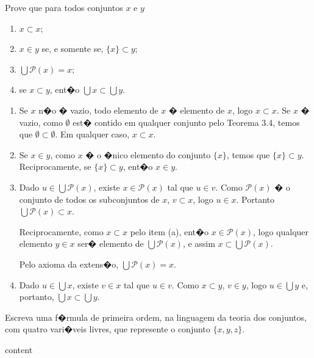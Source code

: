 \begin{exercicio}
	Prove que para todos conjuntos $x$ e $y$
	\begin{enumerate}[label=(\alph{*})]
		\item $x\subset x$;
		\item $x\in y$ se, e somente se, $\{x\}\subset y$;
		\item $\bigcup\mathcal{P}(x)=x$;
		\item se $x\subset y$, ent�o $\bigcup x\subset \bigcup y$.
	\end{enumerate}
\end{exercicio}
\begin{solucao}
	\begin{enumerate}[label=(\alph{*})]
		\item Se $x$ n�o � vazio, todo elemento de $x$ � elemento de $x$, logo $x\subset x$. Se $x$ � vazio, como $\emptyset$ est� contido em qualquer conjunto pelo Teorema 3.4, temos que $\emptyset\subset \emptyset$. Em qualquer caso, $x\subset x$.
		\item Se $x\in y$, como $x$ � o �nico elemento do conjunto $\{x\}$, temos que $\{x\}\subset y$. Reciprocamente, se $\{x\}\subset y$, ent�o $x\in y$.
		\item Dado $u\in\bigcup\mathcal{P}(x)$, existe $x\in\mathcal{P}(x)$ tal que $u\in v$. Como $\mathcal{P}(x)$ � o conjunto de todos os subconjuntos de $x$, $v\subset x$, logo $u\in x$. Portanto $\bigcup\mathcal{P}(x)\subset x$.
		
		Reciprocamente, como $x\subset x$ pelo item (a), ent�o $x\in\mathcal{P}(x)$, logo qualquer elemento $y\in x$ ser� elemento de $\bigcup\mathcal{P}(x)$, e assim $x\subset \bigcup\mathcal{P}(x)$.
		
		Pelo axioma da extens�o, $\bigcup\mathcal{P}(x)=x$.
		\item Dado $u\in\bigcup x$, existe $v\in x$ tal que $u\in v$. Como $x\subset y$, $v\in y$, logo $u\in\bigcup y$ e, portanto, $\bigcup x\subset\bigcup y$.
	\end{enumerate}
\end{solucao}

\begin{exercicio}
	Escreva uma f�rmula de primeira ordem, na linguagem da teoria dos conjuntos, com quatro vari�veis livres, que represente o conjunto $\{x,y,z\}$.
\end{exercicio}
\begin{solucao}
	content
\end{solucao}

